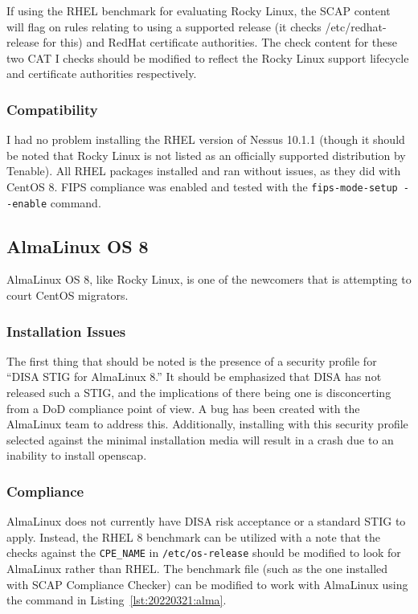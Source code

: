 If using the RHEL benchmark for evaluating Rocky Linux, the SCAP content will flag on rules relating to using a supported release (it checks /etc/redhat-release for this) and RedHat certificate authorities. The check content for these two CAT I checks should be modified to reflect the Rocky Linux support lifecycle and certificate authorities respectively.

\subsubsection{Compatibility}
I had no problem installing the RHEL version of Nessus 10.1.1 (though it should be noted that Rocky Linux is not listed as an officially supported distribution by Tenable). All RHEL packages installed and ran without issues, as they did with CentOS 8. FIPS compliance was enabled and tested with the \texttt{fips-mode-setup -\phantom{}-enable} command.

\subsection{AlmaLinux OS 8}
AlmaLinux OS 8, like Rocky Linux, is one of the newcomers that is attempting to court CentOS migrators.

\subsubsection{Installation Issues}
The first thing that should be noted is the presence of a security profile for ``DISA STIG for AlmaLinux 8.'' It should be emphasized that DISA has not released such a STIG, and the implications of there being one is disconcerting from a DoD compliance point of view. A bug has been created with the AlmaLinux team to address this.\autocite{20220321:almabug} Additionally, installing with this security profile selected against the minimal installation media will result in a crash due to an inability to install openscap.

\subsubsection{Compliance}
AlmaLinux does not currently have DISA risk acceptance or a standard STIG to apply. Instead, the RHEL 8 benchmark can be utilized with a note that the checks against the \texttt{CPE\_NAME} in \texttt{/etc/os-release} should be modified to look for AlmaLinux rather than RHEL. The benchmark file (such as the one installed with SCAP Compliance Checker) can be modified to work with AlmaLinux using the command in Listing~\ref{lst:20220321:alma}.

